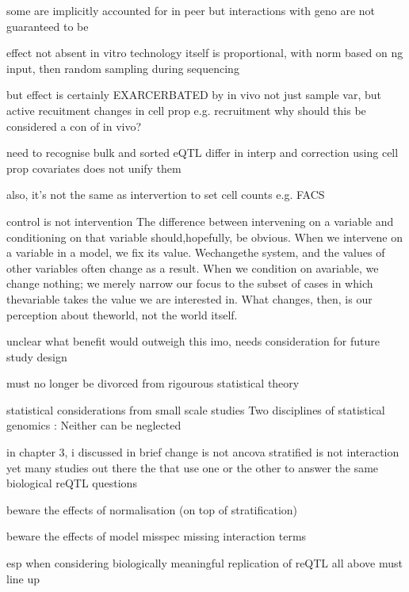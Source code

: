 \begin{outline}
    some are implicitly accounted for in peer
        but interactions with geno are not guaranteed to be

    effect not absent in vitro
        technology itself is proportional, with norm based on ng input, then random sampling during sequencing

    but effect is certainly EXARCERBATED by in vivo
        not just sample var, but active recuitment changes in cell prop e.g. recruitment
            why should this be considered a con of in vivo?

    need to recognise 
        bulk and sorted eQTL differ in interp
            and correction using cell prop covariates does not unify them

        also, it's not the same as intervertion to set cell counts e.g. FACS

            control is not intervention
                The difference between intervening on a variable and conditioning on that
                variable should,hopefully, be obvious. When we intervene on a variable in a
                model, we fix its value. Wechangethe system, and the values of other variables
                often change as a result. When we condition on avariable, we change nothing; we
                merely narrow our focus to the subset of cases in which thevariable takes the
                value we are interested in. What changes, then, is our perception about
                theworld, not the world itself.

    unclear what benefit would outweigh this
        imo, needs consideration for future study design

    must no longer be divorced from rigourous statistical theory

        statistical considerations from small scale studies
            Two disciplines of statistical genomics : Neither can be neglected

            in chapter 3, i discussed in brief
                change is not ancova
                stratified is not interaction
                yet many studies out there the that use one or the other to answer the same biological reQTL questions

        beware the effects of normalisation (on top of stratification)

        beware the effects of model misspec
            missing interaction terms

        esp when considering biologically meaningful replication of reQTL
            all above must line up


\end{outline}
